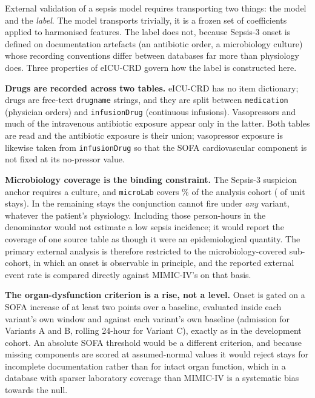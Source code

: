 External validation of a sepsis model requires transporting two things: the
model and the \emph{label}. The model transports trivially, it is a frozen
set of coefficients applied to harmonised features. The label does not, because
Sepsis-3 onset is defined on documentation artefacts (an antibiotic order, a
microbiology culture) whose recording conventions differ between databases far
more than physiology does. Three properties of eICU-CRD govern how the label is
constructed here.

\textbf{Drugs are recorded across two tables.} eICU-CRD has no item
dictionary; drugs are free-text \texttt{drugname} strings, and they are split
between \texttt{medication} (physician orders) and \texttt{infusionDrug}
(continuous infusions). Vasopressors and much of the intravenous antibiotic
exposure appear only in the latter. Both tables are read and the antibiotic
exposure is their union; vasopressor exposure is likewise taken from
\texttt{infusionDrug} so that the SOFA cardiovascular component is not fixed at
its no-pressor value.

\textbf{Microbiology coverage is the binding constraint.} The Sepsis-3
suspicion anchor requires a culture, and \texttt{microLab} covers
\pcExtMicroCoverage\% of the analysis cohort (\pcExtNMicroStays{} of
\pcExtNCohortStays{} unit stays). In the remaining stays the conjunction cannot
fire under \emph{any} variant, whatever the patient's physiology. Including
those person-hours in the denominator would not estimate a low sepsis
incidence; it would report the coverage of one source table as though it were
an epidemiological quantity. The primary external analysis is therefore
restricted to the microbiology-covered sub-cohort, in which an onset is
observable in principle, and the reported external event rate is compared
directly against MIMIC-IV's on that basis.

\textbf{The organ-dysfunction criterion is a rise, not a level.} Onset is
gated on a SOFA increase of at least two points over a baseline, evaluated
inside each variant's own window and against each variant's own baseline
(admission for Variants A and B, rolling 24-hour for Variant C), exactly as in
the development cohort. An absolute SOFA threshold would be a different
criterion, and because missing components are scored at assumed-normal values
it would reject stays for incomplete documentation rather than for intact organ
function, which in a database with sparser laboratory coverage than MIMIC-IV
is a systematic bias towards the null.

